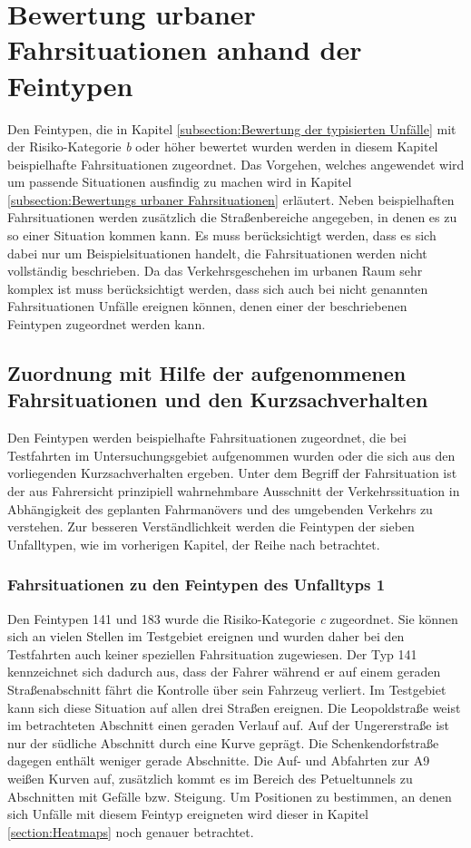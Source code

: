 \section{Bewertung urbaner Fahrsituationen anhand der Feintypen}\label{section:Zuordnung der Unfälle zu Fahrsituationen}
Den Feintypen, die in Kapitel \ref{subsection:Bewertung der typisierten Unfälle} mit der Risiko-Kategorie \textit{b} oder höher bewertet wurden werden in diesem Kapitel beispielhafte Fahrsituationen zugeordnet. Das Vorgehen, welches angewendet wird um passende Situationen ausfindig zu machen wird in Kapitel \ref{subsection:Bewertungs urbaner Fahrsituationen} erläutert. Neben beispielhaften Fahrsituationen werden zusätzlich die Straßenbereiche angegeben, in denen es zu so einer Situation kommen kann. Es muss berücksichtigt werden, dass es sich dabei nur um Beispielsituationen handelt, die Fahrsituationen werden nicht vollständig beschrieben. Da das Verkehrsgeschehen im urbanen Raum sehr komplex ist muss berücksichtigt werden, dass sich auch bei nicht genannten Fahrsituationen Unfälle ereignen können, denen einer der beschriebenen Feintypen zugeordnet werden kann.

\subsection{Zuordnung mit Hilfe der aufgenommenen Fahrsituationen und den Kurzsachverhalten}\label{subsection:Zuordnung mit den aufgenommenen Fahrsituationen}
Den Feintypen werden beispielhafte Fahrsituationen zugeordnet, die bei Testfahrten im Untersuchungsgebiet aufgenommen wurden oder die sich aus den vorliegenden Kurzsachverhalten ergeben. Unter dem Begriff der Fahrsituation ist der aus Fahrersicht prinzipiell wahrnehmbare Ausschnitt der Verkehrssituation in Abhängigkeit des geplanten Fahrmanövers und des umgebenden Verkehrs zu verstehen. Zur besseren Verständlichkeit werden die Feintypen der sieben Unfalltypen, wie im vorherigen Kapitel, der Reihe nach betrachtet.

\subsubsection{Fahrsituationen zu den Feintypen des Unfalltyps 1}
Den Feintypen 141 und 183 wurde die Risiko-Kategorie \textit{c} zugeordnet. Sie können sich an vielen Stellen im Testgebiet ereignen und wurden daher bei den Testfahrten auch keiner speziellen Fahrsituation zugewiesen. Der Typ 141 kennzeichnet sich dadurch aus, dass der Fahrer während er auf einem geraden Straßenabschnitt fährt die Kontrolle über sein Fahrzeug verliert. Im Testgebiet kann sich diese Situation auf allen drei Straßen ereignen. Die Leopoldstraße weist im betrachteten Abschnitt einen geraden Verlauf auf. Auf der Ungererstraße ist nur der südliche Abschnitt durch eine Kurve geprägt. Die Schenkendorfstraße dagegen enthält weniger gerade Abschnitte. Die Auf- und Abfahrten zur A9 weißen Kurven auf, zusätzlich kommt es im Bereich des Petueltunnels zu Abschnitten mit Gefälle bzw. Steigung. Um Positionen zu bestimmen, an denen sich Unfälle mit diesem Feintyp ereigneten wird dieser in Kapitel \ref{section:Heatmaps} noch genauer betrachtet.

